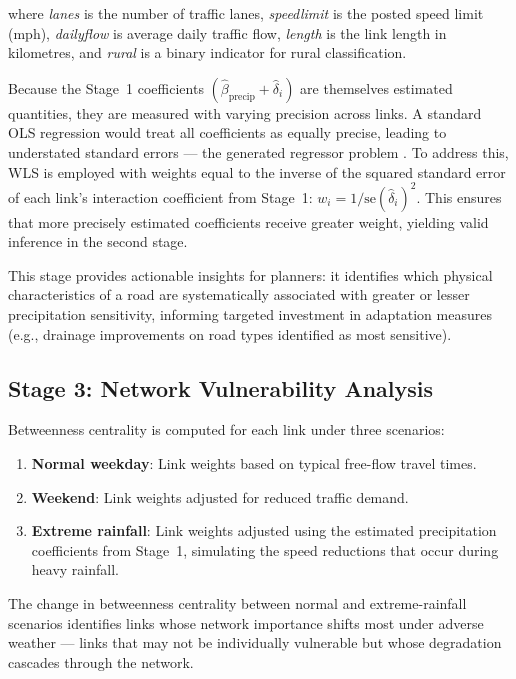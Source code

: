 \documentclass[review]{elsarticle}
\begin{document}
\noindent where \textit{lanes} is the number of traffic lanes, \textit{speedlimit} is the posted speed limit (mph), \textit{dailyflow} is average daily traffic flow, \textit{length} is the link length in kilometres, and \textit{rural} is a binary indicator for rural classification.

Because the Stage~1 coefficients $(\hat{\beta}_{\text{precip}} + \hat{\delta}_i)$ are themselves estimated quantities, they are measured with varying precision across links. A standard OLS regression would treat all coefficients as equally precise, leading to understated standard errors --- the generated regressor problem \citep{mccullagh1989glm}. To address this, WLS is employed with weights equal to the inverse of the squared standard error of each link's interaction coefficient from Stage~1: $w_i = 1 / \text{se}(\hat{\delta}_i)^2$. This ensures that more precisely estimated coefficients receive greater weight, yielding valid inference in the second stage.

This stage provides actionable insights for planners: it identifies which physical characteristics of a road are systematically associated with greater or lesser precipitation sensitivity, informing targeted investment in adaptation measures (e.g., drainage improvements on road types identified as most sensitive).

\subsection{Stage 3: Network Vulnerability Analysis}
\label{sec:method:centrality}

Betweenness centrality \citep{freeman1977centrality} is computed for each link under three scenarios:

\begin{enumerate}
    \item \textbf{Normal weekday}: Link weights based on typical free-flow travel times.
    \item \textbf{Weekend}: Link weights adjusted for reduced traffic demand.
    \item \textbf{Extreme rainfall}: Link weights adjusted using the estimated precipitation coefficients from Stage~1, simulating the speed reductions that occur during heavy rainfall.
\end{enumerate}

The change in betweenness centrality between normal and extreme-rainfall scenarios identifies links whose network importance shifts most under adverse weather --- links that may not be individually vulnerable but whose degradation cascades through the network.
\end{document}
